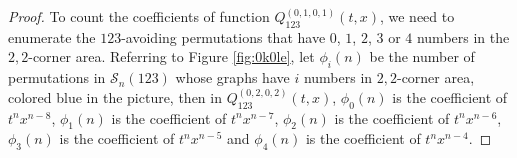 \documentclass[
final,nomarks
]{dmtcs-episciences}
\newcommand{\fref}[1]{Figure \ref{fig:#1}}
\newcommand{\Sn}[1]{\mathcal{S}_{#1}}
\newcommand{\Qm}[1]{Q_{123}^{(#1)}(t,x)}
\begin{document}
\begin{proof}
	To count the coefficients of function \begin{math}\Qm{0,1,0,1}\end{math}, we need to enumerate the \begin{math}123\end{math}-avoiding permutations that have \begin{math}0\end{math}, \begin{math}1\end{math}, \begin{math}2\end{math}, \begin{math}3\end{math} or \begin{math}4\end{math} numbers in the \begin{math}2,2\end{math}-corner area. Referring to \fref{0k0le}, let \begin{math}\phi_i(n)\end{math} be the number of permutations in \begin{math}\Sn{n}(123)\end{math} whose graphs have \begin{math}i\end{math} numbers in \begin{math}2,2\end{math}-corner area, colored blue in the picture, then in \begin{math}\Qm{0,2,0,2}\end{math}, \begin{math}\phi_0(n)\end{math} is the coefficient of \begin{math}t^n x^{n-8}\end{math}, \begin{math}\phi_1(n)\end{math} is the coefficient of \begin{math}t^n x^{n-7}\end{math}, \begin{math}\phi_2(n)\end{math} is the coefficient of \begin{math}t^n x^{n-6}\end{math}, \begin{math}\phi_3(n)\end{math} is the coefficient of \begin{math}t^n x^{n-5}\end{math} and \begin{math}\phi_4(n)\end{math} is the coefficient of \begin{math}t^n x^{n-4}\end{math}. 
	

\end{proof}
\end{document}
